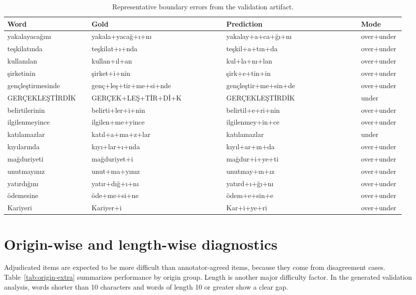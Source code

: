 \documentclass[11pt]{article}
\begin{document}
\begin{table}[h]
\centering
\caption{Representative boundary errors from the validation artifact.}
\label{tab:extended-wrong}
\small
\begin{tabular}{p{0.20\linewidth}p{0.32\linewidth}p{0.32\linewidth}p{0.10\linewidth}}
\toprule
Word & Gold & Prediction & Mode \\
\midrule
yakalayacağını & yakala+yacağ+ı+nı & yakalay+a+ca+ğı+nı & over+under \\
teşkilatında & teşkilat+ı+nda & teşkil+a+tın+da & over+under \\
kullanılan & kullan+ıl+an & kul+la+nı+lan & over+under \\
şirketinin & şirket+i+nin & şirk+e+tin+in & over+under \\
gençleştirmesinde & genç+leş+tir+me+si+nde & gençleştir+me+sin+de & over+under \\
GERÇEKLEŞTİRDİK & GERÇEK+LEŞ+TİR+Dİ+K & GERÇEKLEŞTİRDİK & under \\
belirtilerinin & belirti+ler+i+nin & belirtil+e+ri+nin & over+under \\
ilgilenmeyince & ilgilen+me+yince & ilgilenmey+in+ce & over+under \\
katılamazlar & katıl+a+ma+z+lar & katılamazlar & under \\
kıyılarında & kıyı+lar+ı+nda & kıyıl+ar+ın+da & over+under \\
mağduriyeti & mağduriyet+i & mağdur+i+ye+ti & over+under \\
unutmayınız & unut+ma+yınız & unutmay+ın+ız & over+under \\
yatırdığını & yatır+dığ+ı+nı & yatırd+ı+ğı+nı & over+under \\
ödemesine & öde+me+si+ne & ödem+e+sin+e & over+under \\
Kariyeri & Kariyer+i & Kar+i+ye+ri & over+under \\
\bottomrule
\end{tabular}
\end{table}

\section{Origin-wise and length-wise diagnostics}
Adjudicated items are expected to be more difficult than annotator-agreed items, because they come from disagreement cases. Table~\ref{tab:origin-extra} summarizes performance by origin group. Length is another major difficulty factor. In the generated validation analysis, words shorter than 10 characters and words of length 10 or greater show a clear gap.
\end{document}
